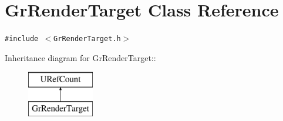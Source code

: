 \hypertarget{class_gr_render_target}{
\section{GrRenderTarget Class Reference}
\label{class_gr_render_target}
}
{\tt \#include $<$GrRenderTarget.h$>$}

Inheritance diagram for GrRenderTarget::\begin{figure}[H]
\begin{center}
\leavevmode
\includegraphics[height=2cm]{class_gr_render_target}
\end{center}
\end{figure}
